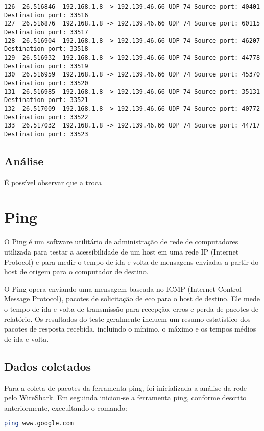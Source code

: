 \documentclass[a4paper]{report} %
\begin{document}
\begin{lstlisting}
126  26.516846  192.168.1.8 -> 192.139.46.66 UDP 74 Source port: 40401  Destination port: 33516
127  26.516876  192.168.1.8 -> 192.139.46.66 UDP 74 Source port: 60115  Destination port: 33517
128  26.516904  192.168.1.8 -> 192.139.46.66 UDP 74 Source port: 46207  Destination port: 33518
129  26.516932  192.168.1.8 -> 192.139.46.66 UDP 74 Source port: 44778  Destination port: 33519
130  26.516959  192.168.1.8 -> 192.139.46.66 UDP 74 Source port: 45370  Destination port: 33520
131  26.516985  192.168.1.8 -> 192.139.46.66 UDP 74 Source port: 35131  Destination port: 33521
132  26.517009  192.168.1.8 -> 192.139.46.66 UDP 74 Source port: 40772  Destination port: 33522
133  26.517032  192.168.1.8 -> 192.139.46.66 UDP 74 Source port: 44717  Destination port: 33523

\end{lstlisting}

\subsection{Análise}
\label{sub_traceroute_analise}
É possível observar que a troca

\section{Ping}
\label{sec_ping}
O Ping é um software utilitário de administração de rede de computadores utilizada para testar a acessibilidade de um host em uma rede IP (Internet Protocol) e para medir o tempo de ida e volta de mensagens enviadas a partir do host de origem para o computador de destino.

O Ping opera enviando uma mensagem baseada no ICMP (Internet Control Message Protocol), pacotes de solicitação de eco para o host de destino. Ele mede o tempo de ida e volta de transmissão para recepção, erros e perda de pacotes de relatório. Os resultados do teste geralmente incluem um resumo estatístico dos pacotes de resposta recebida, incluindo o mínimo, o máximo e os tempos médios de ida e volta.

\subsection{Dados coletados}
\label{sub_ping_dados}
Para a coleta de pacotes da ferramenta ping, foi inicializada a análise da rede pelo WireShark. Em seguinda iniciou-se a ferramenta ping, conforme descrito anteriormente, execultando o comando:

\begin{lstlisting}[language=bash]
ping www.google.com
\end{lstlisting}
\end{document}

